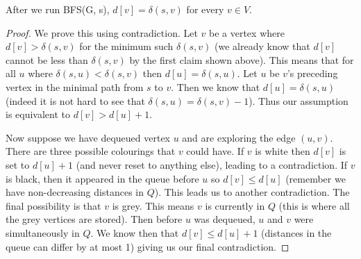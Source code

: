 \begin{theorem}
After we run BFS(G, s), $d[v] = \delta(s, v)$ for every $v \in V$.
\end{theorem}
\begin{proof}
We prove this using contradiction. Let $v$ be a vertex where $d[v] > \delta(s, v)$ for the minimum such $\delta(s, v)$ (we already know that $d[v]$ cannot be less than $\delta(s, v)$ by the first claim shown above). This means that for all $u$ where $\delta(s, u) < \delta(s, v)$ then $d[u] = \delta(s, u)$. Let $u$ be $v$'s preceding vertex in the minimal path from $s$ to $v$. Then we know that $d[u] = \delta(s, u)$ (indeed it is not hard to see that $\delta(s, u) = \delta(s, v) - 1$). Thus our assumption is equivalent to $d[v] > d[u] + 1$.

Now suppose we have dequeued vertex $u$ and are exploring the edge $(u, v)$. There are three possible colourings that $v$ could have. If $v$ is white then $d[v]$ is set to $d[u] + 1$ (and never reset to anything else), leading to a contradiction. If $v$ is black, then it appeared in the queue before $u$ so $d[v] \leq d[u]$ (remember we have non-decreasing distances in $Q$). This leads us to another contradiction. The final possibility is that $v$ is grey. This means $v$ is currently in $Q$ (this is where all the grey vertices are stored). Then before $u$ was dequeued, $u$ and $v$ were simultaneously in $Q$. We know then that $d[v] \leq d[u] + 1$ (distances in the queue can differ by at most 1) giving us our final contradiction.
\end{proof}